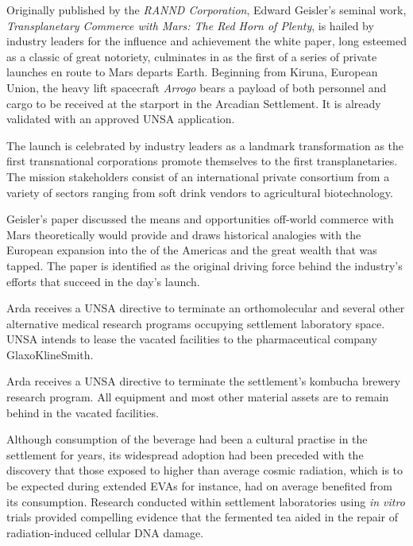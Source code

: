 

Originally published by the {\it RANND Corporation}, Edward Geisler's seminal work, {\it Transplanetary Commerce with Mars: The Red Horn of Plenty}, is hailed by industry leaders for the influence and achievement the white paper, long esteemed as a classic of great notoriety, culminates in as the first of a series of private launches en route to Mars departs Earth. Beginning from Kiruna, European Union, the heavy lift spacecraft {\it Arrogo} bears a payload of both personnel and cargo to be received at the starport in the Arcadian Settlement. It is already validated with an approved UNSA application.

The launch is celebrated by industry leaders as a landmark transformation as the first transnational corporations promote themselves to the first transplanetaries. The mission stakeholders consist of an international private consortium from a variety of sectors ranging from soft drink vendors to agricultural biotechnology.

Geisler's paper discussed the means and opportunities off-world commerce with Mars theoretically would provide and draws historical analogies with the European expansion into the  of the Americas and the great wealth that was tapped. The paper is identified as the original driving force behind the industry's efforts that succeed in the day's launch.
\StopTimelineDate

Arda receives a UNSA directive to terminate an orthomolecular and several other alternative medical research programs occupying settlement laboratory space. UNSA intends to lease the vacated facilities to the pharmaceutical company GlaxoKlineSmith.
\StopTimelineDate

Arda receives a UNSA directive to terminate the settlement's kombucha brewery research program. All equipment and most other material assets are to remain behind in the vacated facilities. 

Although consumption of the beverage had been a cultural practise in the settlement for years, its widespread adoption had been preceded with the discovery that those exposed to higher than average cosmic radiation, which is to be expected during extended EVAs for instance, had on average benefited from its consumption. Research conducted within settlement laboratories using {\it in vitro} trials provided compelling evidence that the fermented tea aided in the repair of radiation-induced cellular DNA damage. 

